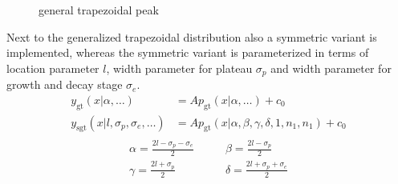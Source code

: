 \begin{figure}[htb]
\captionsetup[subfigure]{position=b}
\centering
{}
\hfill
{}
\caption{general trapezoidal peak}
\end{figure}

Next to the generalized trapezoidal distribution also a symmetric variant is implemented, whereas the symmetric variant is parameterized in terms of location parameter $l$, width parameter for plateau $\sigma_p$ and width parameter for growth and decay stage $\sigma_e$.
\begin{align}\label{eq:generalizedtrapezoidalpeakArea}
y_\mathrm{gt}(x|\alpha,\ldots) &= A\textstyle p_\mathrm{gt}(x|\alpha,\ldots) +c_0 \\
y_\mathrm{sgt}(x|l,\sigma_p,\sigma_e,\ldots) &= A \textstyle p_\mathrm{gt}\left(x|\alpha,\beta,\gamma,\delta,1,n_1,n_1\right) +c_0 \end{align}
\begin{align}
\begin{array}{ll} 
\displaystyle\alpha = \frac{2l-\sigma_p-\sigma_e}{2} & \displaystyle\qquad \beta  = \frac{2l-\sigma_p}{2} \\
\displaystyle\gamma = \frac{2l+\sigma_p}{2}          & \displaystyle\qquad \delta = \frac{2l+\sigma_p+\sigma_e}{2}
\end{array}
\end{align}

